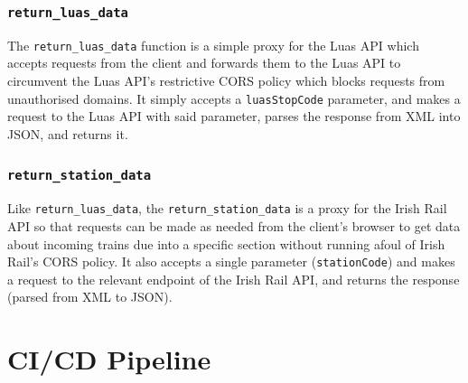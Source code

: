 \documentclass[a4paper,11pt]{report}
\begin{document}
\subsubsection{\texttt{return_luas_data}}
The \verb|return_luas_data| function is a simple proxy for the Luas API which accepts requests from the client and forwards them to the Luas API to circumvent the Luas API's restrictive CORS policy which blocks requests from unauthorised domains.
It simply accepts a \verb|luasStopCode| parameter, and makes a request to the Luas API with said parameter, parses the response from XML into JSON, and returns it.

\subsubsection{\texttt{return_station_data}}
Like \verb|return_luas_data|, the \verb|return_station_data| is a proxy for the Irish Rail API so that requests can be made as needed from the client's browser to get data about incoming trains due into a specific section without running afoul of Irish Rail's CORS policy.
It also accepts a single parameter (\verb|stationCode|) and makes a request to the relevant endpoint of the Irish Rail API, and returns the response (parsed from XML to JSON).

\section{CI/CD Pipeline}
\end{document}
